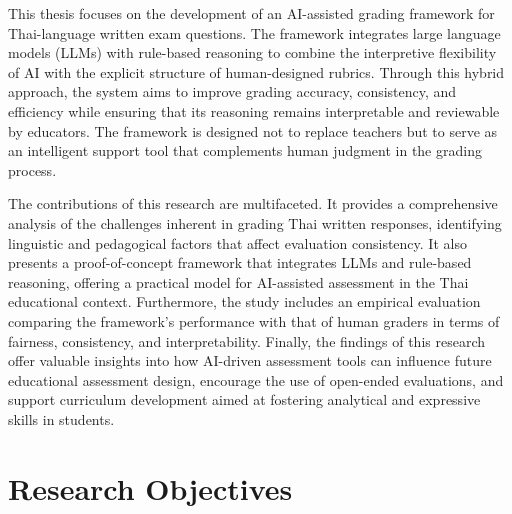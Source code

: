 This thesis focuses on the development of an AI-assisted 
grading framework for Thai-language written exam questions. 
The framework integrates large language models (LLMs) with 
rule-based reasoning to combine the interpretive flexibility 
of AI with the explicit structure of human-designed rubrics. 
Through this hybrid approach, the system aims to improve 
grading accuracy, consistency, and efficiency while ensuring 
that its reasoning remains interpretable and reviewable by 
educators. The framework is designed not to replace teachers 
but to serve as an intelligent support tool that complements 
human judgment in the grading process.

The contributions of this research are multifaceted. It 
provides a comprehensive analysis of the challenges inherent 
in grading Thai written responses, identifying linguistic and 
pedagogical factors that affect evaluation consistency. It 
also presents a proof-of-concept framework that integrates 
LLMs and rule-based reasoning, offering a practical model for 
AI-assisted assessment in the Thai educational context. 
Furthermore, the study includes an empirical evaluation 
comparing the framework’s performance with that of human 
graders in terms of fairness, consistency, and 
interpretability. Finally, the findings of this research 
offer valuable insights into how AI-driven assessment tools 
can influence future educational assessment design, encourage 
the use of open-ended evaluations, and support curriculum 
development aimed at fostering analytical and expressive 
skills in students.

\section{Research Objectives}


